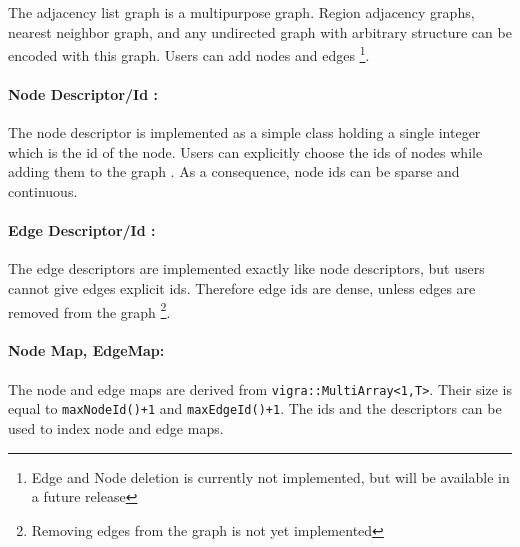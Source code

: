 The adjacency list graph is a multipurpose graph.
Region adjacency graphs, nearest neighbor graph,
and  any undirected graph with arbitrary structure can 
be encoded with this graph.
Users can add nodes and edges \footnote{Edge and Node deletion is currently
not implemented, but will be available in a future release}.


\paragraph{Node Descriptor/Id :}
The node descriptor is implemented as a simple class
holding a single integer which is the id 
of the node.
Users can explicitly choose the ids of
nodes while adding them to the graph . As a consequence, node ids can 
be sparse and continuous.

\paragraph{Edge Descriptor/Id :}
The edge descriptors are implemented exactly like
node descriptors, but users cannot give
edges explicit ids.
Therefore edge ids are dense, unless
edges are removed from the graph \footnote{Removing edges from the graph is
not yet implemented}.

\paragraph{Node Map, EdgeMap:} 
The node and edge maps are derived from \lstinline{vigra::MultiArray<1,T>}.
Their size is equal to \lstinline{maxNodeId()+1} and  \lstinline{maxEdgeId()+1}.
The ids and the descriptors can be used to index node and edge maps.


%
%
%
%


